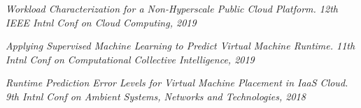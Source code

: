
\begin{cventries}

  \cventry
    {} %
    {} %
    {} %
    {} %
    {
      \vspace{-.4cm}
      \begin{cvitems} %
      \item {\textit{Workload Characterization for a Non-Hyperscale Public Cloud Platform. 12th IEEE Intnl Conf on Cloud Computing, 2019}}
      \item {\textit{Applying Supervised Machine Learning to Predict Virtual Machine Runtime. 11th Intnl Conf on Computational Collective Intelligence, 2019}}
	\item {\textit{Runtime Prediction Error Levels for Virtual Machine Placement in IaaS Cloud. 9th Intnl Conf on Ambient Systems, Networks and Technologies, 2018}}
      \end{cvitems}
    }

\end{cventries}
